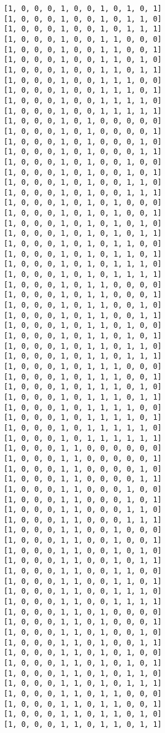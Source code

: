 \documentclass[11pt]{article}
\begin{document}
\begin{Verbatim}[commandchars=\\\{\}]
[1, 0, 0, 0, 1, 0, 0, 1, 0, 1, 0, 1]
[1, 0, 0, 0, 1, 0, 0, 1, 0, 1, 1, 0]
[1, 0, 0, 0, 1, 0, 0, 1, 0, 1, 1, 1]
[1, 0, 0, 0, 1, 0, 0, 1, 1, 0, 0, 0]
[1, 0, 0, 0, 1, 0, 0, 1, 1, 0, 0, 1]
[1, 0, 0, 0, 1, 0, 0, 1, 1, 0, 1, 0]
[1, 0, 0, 0, 1, 0, 0, 1, 1, 0, 1, 1]
[1, 0, 0, 0, 1, 0, 0, 1, 1, 1, 0, 0]
[1, 0, 0, 0, 1, 0, 0, 1, 1, 1, 0, 1]
[1, 0, 0, 0, 1, 0, 0, 1, 1, 1, 1, 0]
[1, 0, 0, 0, 1, 0, 0, 1, 1, 1, 1, 1]
[1, 0, 0, 0, 1, 0, 1, 0, 0, 0, 0, 0]
[1, 0, 0, 0, 1, 0, 1, 0, 0, 0, 0, 1]
[1, 0, 0, 0, 1, 0, 1, 0, 0, 0, 1, 0]
[1, 0, 0, 0, 1, 0, 1, 0, 0, 0, 1, 1]
[1, 0, 0, 0, 1, 0, 1, 0, 0, 1, 0, 0]
[1, 0, 0, 0, 1, 0, 1, 0, 0, 1, 0, 1]
[1, 0, 0, 0, 1, 0, 1, 0, 0, 1, 1, 0]
[1, 0, 0, 0, 1, 0, 1, 0, 0, 1, 1, 1]
[1, 0, 0, 0, 1, 0, 1, 0, 1, 0, 0, 0]
[1, 0, 0, 0, 1, 0, 1, 0, 1, 0, 0, 1]
[1, 0, 0, 0, 1, 0, 1, 0, 1, 0, 1, 0]
[1, 0, 0, 0, 1, 0, 1, 0, 1, 0, 1, 1]
[1, 0, 0, 0, 1, 0, 1, 0, 1, 1, 0, 0]
[1, 0, 0, 0, 1, 0, 1, 0, 1, 1, 0, 1]
[1, 0, 0, 0, 1, 0, 1, 0, 1, 1, 1, 0]
[1, 0, 0, 0, 1, 0, 1, 0, 1, 1, 1, 1]
[1, 0, 0, 0, 1, 0, 1, 1, 0, 0, 0, 0]
[1, 0, 0, 0, 1, 0, 1, 1, 0, 0, 0, 1]
[1, 0, 0, 0, 1, 0, 1, 1, 0, 0, 1, 0]
[1, 0, 0, 0, 1, 0, 1, 1, 0, 0, 1, 1]
[1, 0, 0, 0, 1, 0, 1, 1, 0, 1, 0, 0]
[1, 0, 0, 0, 1, 0, 1, 1, 0, 1, 0, 1]
[1, 0, 0, 0, 1, 0, 1, 1, 0, 1, 1, 0]
[1, 0, 0, 0, 1, 0, 1, 1, 0, 1, 1, 1]
[1, 0, 0, 0, 1, 0, 1, 1, 1, 0, 0, 0]
[1, 0, 0, 0, 1, 0, 1, 1, 1, 0, 0, 1]
[1, 0, 0, 0, 1, 0, 1, 1, 1, 0, 1, 0]
[1, 0, 0, 0, 1, 0, 1, 1, 1, 0, 1, 1]
[1, 0, 0, 0, 1, 0, 1, 1, 1, 1, 0, 0]
[1, 0, 0, 0, 1, 0, 1, 1, 1, 1, 0, 1]
[1, 0, 0, 0, 1, 0, 1, 1, 1, 1, 1, 0]
[1, 0, 0, 0, 1, 0, 1, 1, 1, 1, 1, 1]
[1, 0, 0, 0, 1, 1, 0, 0, 0, 0, 0, 0]
[1, 0, 0, 0, 1, 1, 0, 0, 0, 0, 0, 1]
[1, 0, 0, 0, 1, 1, 0, 0, 0, 0, 1, 0]
[1, 0, 0, 0, 1, 1, 0, 0, 0, 0, 1, 1]
[1, 0, 0, 0, 1, 1, 0, 0, 0, 1, 0, 0]
[1, 0, 0, 0, 1, 1, 0, 0, 0, 1, 0, 1]
[1, 0, 0, 0, 1, 1, 0, 0, 0, 1, 1, 0]
[1, 0, 0, 0, 1, 1, 0, 0, 0, 1, 1, 1]
[1, 0, 0, 0, 1, 1, 0, 0, 1, 0, 0, 0]
[1, 0, 0, 0, 1, 1, 0, 0, 1, 0, 0, 1]
[1, 0, 0, 0, 1, 1, 0, 0, 1, 0, 1, 0]
[1, 0, 0, 0, 1, 1, 0, 0, 1, 0, 1, 1]
[1, 0, 0, 0, 1, 1, 0, 0, 1, 1, 0, 0]
[1, 0, 0, 0, 1, 1, 0, 0, 1, 1, 0, 1]
[1, 0, 0, 0, 1, 1, 0, 0, 1, 1, 1, 0]
[1, 0, 0, 0, 1, 1, 0, 0, 1, 1, 1, 1]
[1, 0, 0, 0, 1, 1, 0, 1, 0, 0, 0, 0]
[1, 0, 0, 0, 1, 1, 0, 1, 0, 0, 0, 1]
[1, 0, 0, 0, 1, 1, 0, 1, 0, 0, 1, 0]
[1, 0, 0, 0, 1, 1, 0, 1, 0, 0, 1, 1]
[1, 0, 0, 0, 1, 1, 0, 1, 0, 1, 0, 0]
[1, 0, 0, 0, 1, 1, 0, 1, 0, 1, 0, 1]
[1, 0, 0, 0, 1, 1, 0, 1, 0, 1, 1, 0]
[1, 0, 0, 0, 1, 1, 0, 1, 0, 1, 1, 1]
[1, 0, 0, 0, 1, 1, 0, 1, 1, 0, 0, 0]
[1, 0, 0, 0, 1, 1, 0, 1, 1, 0, 0, 1]
[1, 0, 0, 0, 1, 1, 0, 1, 1, 0, 1, 0]
[1, 0, 0, 0, 1, 1, 0, 1, 1, 0, 1, 1]

\end{Verbatim}
\end{document}
